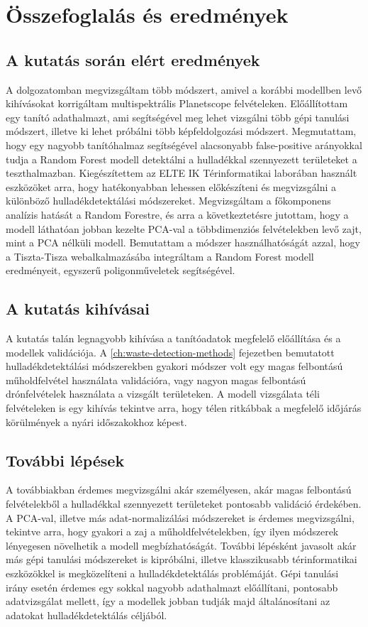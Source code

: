 \chapter{Összefoglalás és eredmények}
\label{ch:sum}

\section{A kutatás során elért eredmények}

A dolgozatomban megvizsgáltam több módszert, amivel a korábbi modellben levő kihívásokat korrigáltam multispektrális Planetscope felvételeken. Előállítottam egy tanító adathalmazt, ami segítségével meg lehet vizsgálni több gépi tanulási módszert, illetve ki lehet próbálni több képfeldolgozási módszert. Megmutattam, hogy egy nagyobb tanítóhalmaz segítségével alacsonyabb false-positive arányokkal tudja a Random Forest modell detektálni a hulladékkal szennyezett területeket a teszthalmazban. Kiegészítettem az ELTE IK Térinformatikai laborában használt eszközöket arra, hogy hatékonyabban lehessen előkészíteni és megvizsgálni a különböző hulladékdetektálási módszereket. Megvizsgáltam a főkomponens analízis hatását a Random Forestre, és arra a következtetésre jutottam, hogy a modell láthatóan jobban kezelte PCA-val a többdimenziós felvételekben levő zajt, mint a PCA nélküli modell. Bemutattam a módszer használhatóságát azzal, hogy a Tiszta-Tisza webalkalmazásába integráltam a Random Forest modell eredményeit, egyszerű poligonműveletek segítségével.

\section{A kutatás kihívásai}

A kutatás talán legnagyobb kihívása a tanítóadatok megfelelő előállítása és a modellek validációja. A \ref{ch:waste-detection-methods} fejezetben bemutatott hulladékdetektálási módszerekben gyakori módszer volt egy magas felbontású műholdfelvétel használata validációra, vagy nagyon magas felbontású drónfelvételek használata a vizsgált területeken. A modell vizsgálata téli felvételeken is egy kihívás tekintve arra, hogy télen ritkábbak a megfelelő időjárás körülmények a nyári időszakokhoz képest. 

\section{További lépések}

A továbbiakban érdemes megvizsgálni akár személyesen, akár magas felbontású felvételekből a hulladékkal szennyezett területeket pontosabb validáció érdekében. A PCA-val, illetve más adat-normalizálási módszereket is érdemes megvizsgálni, tekintve arra, hogy gyakori a zaj a műholdfelvételekben, így ilyen módszerek lényegesen növelhetik a modell megbízhatóságát. További lépésként javasolt akár más gépi tanulási módszereket is kipróbálni, illetve klasszikusabb térinformatikai eszközökkel is megközelíteni a hulladékdetektálás problémáját. Gépi tanulási irány esetén érdemes egy sokkal nagyobb adathalmazt előállítani, pontosabb adatvizsgálat mellett, így a modellek jobban tudják majd általánosítani az adatokat hulladékdetektálás céljából.
